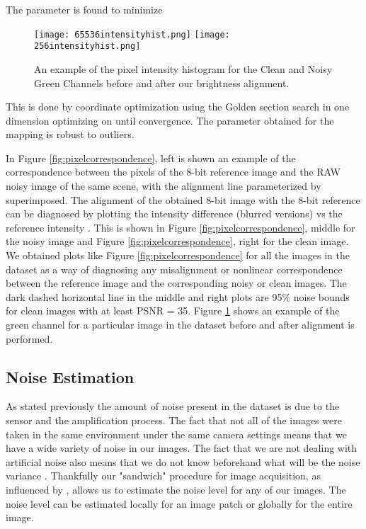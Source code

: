 \documentclass[review]{elsarticle}
\begin{document}
The parameter  is found to minimize

\begin{figure}[t]
\centering
\texttt{[image: 65536intensityhist.png]}
\texttt{[image: 256intensityhist.png]}
\vskip -4mm
\caption{An example of the pixel intensity histogram for the Clean and Noisy Green Channels before and after our brightness alignment. }
\label {fig:alignment}
\vspace{-3mm}
\end{figure}



This is done by coordinate optimization using the Golden section search in one dimension \cite{press2007numerical} optimizing on  until convergence. The parameter  obtained for the mapping is robust to outliers. 

In Figure \ref{fig:pixelcorrespondence}, left is shown an example of the correspondence between the pixels of the 8-bit reference image  and the RAW noisy image  of the same scene, with the alignment line parameterized by  superimposed. The alignment of the obtained 8-bit image  with the 8-bit reference can be diagnosed by plotting the intensity difference  (blurred versions) vs the reference intensity . This is shown in Figure \ref{fig:pixelcorrespondence}, middle for the noisy image and Figure \ref{fig:pixelcorrespondence}, right for the clean image.  We obtained plots like Figure \ref{fig:pixelcorrespondence} for all the images in the dataset as a way of diagnosing any misalignment or nonlinear correspondence between the reference image and the corresponding noisy or clean images. The dark dashed horizontal line in the middle and right plots are 95\% noise bounds for clean images with at least PSNR = 35. Figure \ref{fig:alignment} shows an example of the green channel for a particular image in the dataset before and after alignment is performed. 


\subsection{Noise Estimation}\label{sec:noiseeq}


As stated previously the amount of noise present in the dataset is due to the sensor and the amplification process. The fact that not all of the images were taken in the same environment under the same camera settings means that we have a wide variety of noise in our images. The fact that we are not dealing with artificial noise  also means that we do not know beforehand what will be the noise variance . Thankfully our "sandwich" procedure for image acquisition, as influenced by \cite{RadiometricCCD,NoiseEstimation}, allows us to estimate the noise level for any of our images. The noise level can be estimated locally for an image patch or globally for the entire image.
\end{document}
